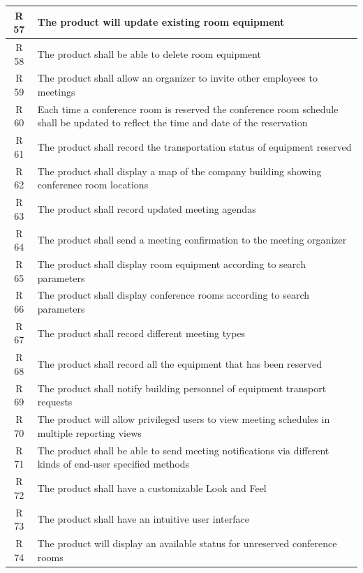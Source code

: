 \documentclass[dissertation,final]{softeng}
\begin{document}
\begin{appendices}
\begin{center}
\begin{longtable}{c m{}}
    R 57  & The product will update existing room equipment \\ \midrule
    R 58  & The product shall be able to delete room equipment \\ \midrule
    R 59  & The product shall allow an organizer to invite other employees to meetings \\ \midrule
    R 60  & Each time a conference room is reserved the conference room schedule shall be updated to reflect the time and date of the reservation \\ \midrule
    R 61  & The product shall record the transportation status of equipment reserved \\ \midrule
    R 62  & The product shall display a map of the company building showing conference room locations \\ \midrule
    R 63  & The product shall record updated meeting agendas \\ \midrule
    R 64  & The product shall send a meeting confirmation to the meeting organizer \\* \midrule
    R 65  & The product shall display room equipment according to search parameters \\ \midrule
    R 66  & The product shall display conference rooms according to search parameters \\ \midrule
    R 67  & The product shall record different meeting types \\ \midrule
    R 68  & The product shall record all the equipment that has been reserved \\ \midrule
    R 69  & The product shall notify building personnel of equipment transport requests \\ \midrule
    R 70  & The product will allow privileged users to view meeting schedules in multiple reporting views \\ \midrule
    R 71  & The product shall be able to send meeting notifications via different kinds of end-user specified methods \\ \midrule
    R 72  & The product shall have a customizable Look and Feel \\ \midrule
    R 73  & The product shall have an intuitive user interface \\ \midrule
    R 74  & The product will display an available status for unreserved conference rooms \\
\end{longtable}
\end{center}



\end{appendices}
\end{document}
